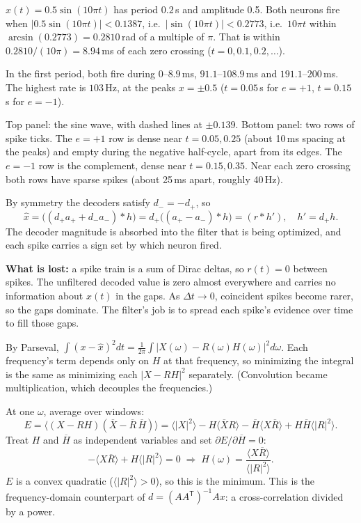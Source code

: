 \documentclass[10pt,letterpaper]{article}
\newcommand{\T}{\mathsf{T}}
\newcommand{\qsec}[1]{\vspace{8pt}{\large\bfseries #1}\par\vspace{2pt}}
\newcommand{\ans}[1]{\par\vspace{3pt}{\bfseries #1}\quad}
\begin{document}
\ans{3c.}
$x(t) = 0.5\sin(10\pi t)$ has period $0.2$\,s and amplitude 0.5. Both neurons fire when $|0.5\sin(10\pi t)| < 0.1387$, i.e.\ $|\sin(10\pi t)| < 0.2773$, i.e.\ $10\pi t$ within $\arcsin(0.2773) = 0.2810$\,rad of a multiple of $\pi$. That is within $0.2810/(10\pi) = 8.94$\,ms of each zero crossing ($t = 0, 0.1, 0.2, \ldots$).
\begin{result}
In the first period, both fire during $0$--$8.9$\,ms, $91.1$--$108.9$\,ms and $191.1$--$200$\,ms. The highest rate is $103$\,Hz, at the peaks $x = \pm 0.5$ ($t = 0.05$\,s for $e = +1$, $t = 0.15$\,s for $e = -1$).
\end{result}
\begin{sketch}
Top panel: the sine wave, with dashed lines at $\pm 0.139$. Bottom panel: two rows of spike ticks. The $e = +1$ row is dense near $t = 0.05, 0.25$ (about 10\,ms spacing at the peaks) and empty during the negative half-cycle, apart from its edges. The $e = -1$ row is the complement, dense near $t = 0.15, 0.35$. Near each zero crossing both rows have sparse spikes (about 25\,ms apart, roughly 40\,Hz).
\end{sketch}

\ans{3d.}
By symmetry the decoders satisfy $d_{-} = -d_{+}$, so
\[
\hat x = \big((d_{+}a_{+} + d_{-}a_{-}) * h\big) = d_{+}\big((a_{+} - a_{-}) * h\big) = (r * h'),\quad h' = d_{+}h.
\]
The decoder magnitude is absorbed into the filter that is being optimized, and each spike carries a sign set by which neuron fired.

\textbf{What is lost:} a spike train is a sum of Dirac deltas, so $r(t) = 0$ between spikes. The unfiltered decoded value is zero almost everywhere and carries no information about $x(t)$ in the gaps. As $\Delta t \to 0$, coincident spikes become rarer, so the gaps dominate. The filter's job is to spread each spike's evidence over time to fill those gaps.

\qsec{4. The optimal linear filter}

\ans{4a.}
By Parseval, $\int (x - \hat x)^2 dt = \frac{1}{2\pi}\int |X(\omega) - R(\omega)H(\omega)|^2 d\omega$. Each frequency's term depends only on $H$ at that frequency, so minimizing the integral is the same as minimizing each $|X - RH|^2$ separately. (Convolution became multiplication, which decouples the frequencies.)

At one $\omega$, average over windows:
\[
E = \big\langle (X - RH)(\overline{X} - \overline{R}\,\overline{H})\big\rangle = \langle|X|^2\rangle - H\langle \overline{X}R\rangle - \overline{H}\langle X\overline{R}\rangle + H\overline{H}\langle|R|^2\rangle.
\]
Treat $H$ and $\overline{H}$ as independent variables and set $\partial E/\partial\overline{H} = 0$:
\[
-\langle X\overline{R}\rangle + H\langle |R|^2\rangle = 0 \;\Rightarrow\; H(\omega) = \frac{\langle X\overline{R}\rangle}{\langle|R|^2\rangle}.
\]
$E$ is a convex quadratic ($\langle|R|^2\rangle > 0$), so this is the minimum. This is the frequency-domain counterpart of $d = (AA^\T)^{-1}Ax$: a cross-correlation divided by a power.
\end{document}

